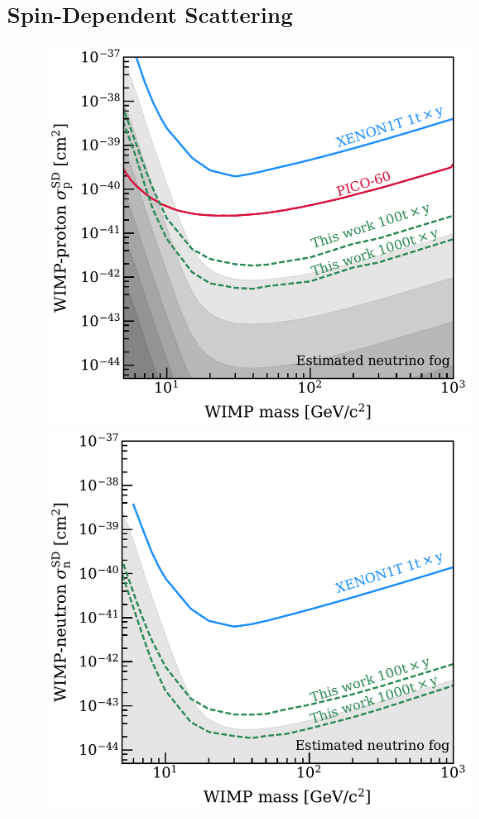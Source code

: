 \subsection{Spin-Dependent Scattering}\label{sec:sd}

\begin{figure}[!htbp] 
	\centering
    \includegraphics[width=\columnwidth,clip]{fig_simplified_projection_sdp.pdf}
    \includegraphics[width=\columnwidth,clip]{fig_simplified_projection_sdn.pdf}

\end{figure}

